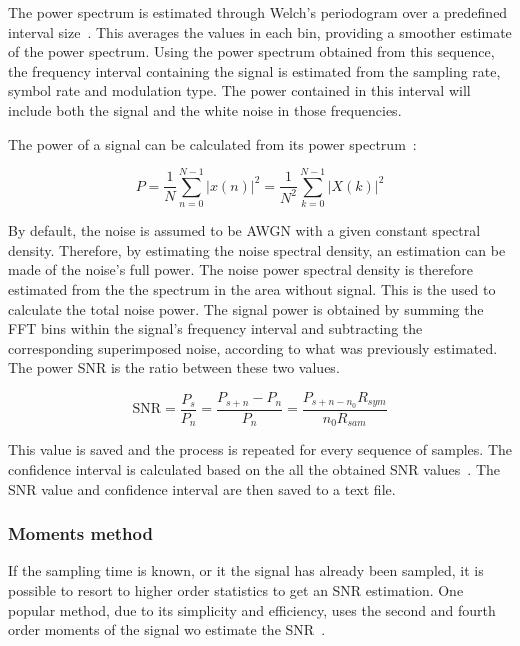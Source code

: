 \begin{refsection}
The power spectrum is estimated through Welch's periodogram over a predefined
interval size~\cite{john2007digital}. This averages the values in each bin,
providing a smoother estimate of the power spectrum.
Using the power spectrum obtained from this sequence, the frequency interval
containing the signal is estimated from the sampling rate, symbol rate and
modulation type. The power contained in this interval will include both the signal
and the white noise in those frequencies.

The power of a signal can be calculated from its power spectrum~\cite{john2007digital}:

\begin{equation}
P = \frac{1}{N} \sum_{n=0}^{N-1} {|x(n)|}^2 = \frac{1}{N^2} \sum_{k=0}^{N-1} {|X(k)|}^2
\end{equation}


By default, the noise is assumed to be AWGN with a given constant spectral
density. Therefore, by estimating the noise spectral density, an estimation can
be made of the noise's full power. The noise power spectral density is therefore
estimated from the the spectrum in the area without signal. This is the used to
calculate the total noise power. The signal power is obtained by summing the FFT
bins within the signal's frequency interval and subtracting the corresponding superimposed noise, according to what was previously estimated. The power SNR is the ratio between these two values.

\begin{equation}
	\text{SNR} = \frac{P_{s}}{P_n} = \frac{P_{s+n} - P_n}{P_n} = \frac{P_{s+n - n_0} R_{sym}}{n_0 R_{sam}}
\end{equation}

This value is saved and the process is repeated for every sequence of samples.
The confidence interval is calculated based on the all the obtained SNR
values~\cite{tranter2004principles}. The SNR value and confidence interval are
then saved to a text file.

\subsubsection*{Moments method}\label{sec:snrEstm2m4}
If the sampling time is known, or it the signal has already been sampled, it is
possible to resort to higher order statistics to get an SNR estimation. One
popular method, due to its simplicity and efficiency, uses the second and fourth
order moments of the signal wo estimate the SNR~\cite{matzner93}.


\end{refsection}
